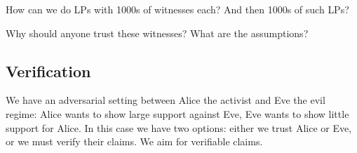 \begin{frame}

  \pause

  \begin{question}
    How can we do \acp{LP} with 1000s of witnesses each?
    And then 1000s of such \acp{LP}?
  \end{question}
  \begin{question}
    Why should anyone trust these witnesses?
    What are the assumptions?
  \end{question}
\end{frame}

\subsection{Verification}
\label{Verification}

We have an adversarial setting between Alice the activist and Eve the evil 
regime: Alice wants to show large support against Eve, Eve wants to show little
support for Alice.
In this case we have two options:
either we trust Alice or Eve, or we must verify their claims.
We aim for verifiable claims.

